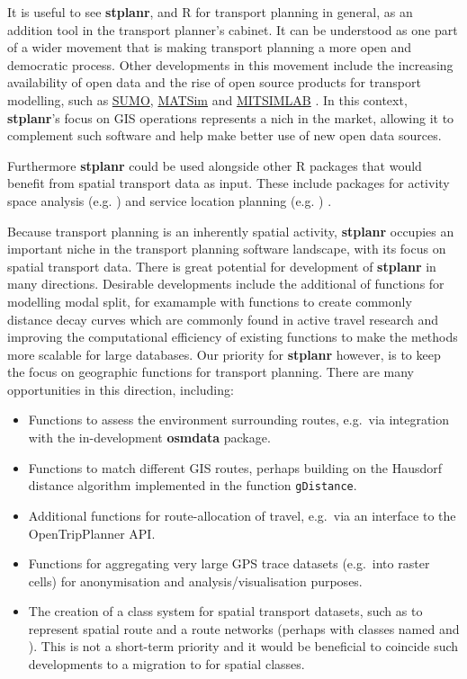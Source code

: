 It is useful to see \textbf{stplanr}, and R for transport planning in
general, as an addition tool in the transport planner's cabinet. It can
be understood as one part of a wider movement that is making transport
planning a more open and democratic process. Other developments in this
movement include the increasing availability of open data
\citep{naumova_building_2016} and the rise of open source products for
transport modelling, such as
\href{http://www.dlr.de/ts/en/desktopdefault.aspx/tabid-9883/16931_read-41000/}{SUMO},
\href{http://www.matsim.org/}{MATSim} and
\href{https://its.mit.edu/software/mitsimlab}{MITSIMLAB}
\citep{saidallah_comparative_2016}.
In this context, \textbf{stplanr}'s focus on
GIS operations represents a nich in the market, allowing it to
complement such software and help make better use of new open data
sources.

Furthermore \textbf{stplanr} could be used alongside other R packages that
would benefit from spatial transport data as input.
These include packages for activity space analysis (e.g. ) and
service location planning (e.g. ) \citep{RJ-2017-020}.


Because transport planning is an inherently spatial activity,
\textbf{stplanr} occupies an important niche in the transport planning
software landscape, with its focus on spatial transport data. There is
great potential for development of \textbf{stplanr} in many directions.
Desirable developments include the additional of functions for modelling
modal split, for examample with functions to create commonly distance
decay curves which are commonly found in active travel research
\citep{martinez_new_2013} and improving the computational efficiency of
existing functions to make the methods more scalable for large
databases. Our priority for \textbf{stplanr} however, is to keep the
focus on geographic functions for transport planning. There are many
opportunities in this direction, including:

\begin{itemize}
\tightlist
\item
  Functions to assess the environment surrounding routes, e.g.~via
  integration with the in-development \textbf{osmdata} package.
\item
  Functions to match different GIS routes, perhaps building on the
  Hausdorf distance algorithm implemented in the 
  function \texttt{gDistance}.
\item
  Additional functions for route-allocation of travel, e.g.~via an
  interface to the OpenTripPlanner API.
\item
  Functions for aggregating very large GPS trace datasets (e.g.~into
  raster cells) for anonymisation and analysis/visualisation purposes.
\item
  The creation of a class system for spatial transport datasets, such as
  to represent spatial route and a route networks (perhaps with classes
  named  and ). This is not a short-term priority
  and it would be beneficial to coincide such developments to a
  migration to  for spatial classes.
\end{itemize}


